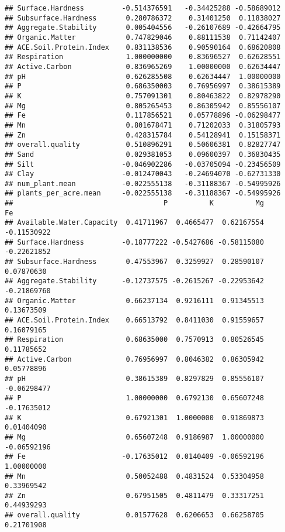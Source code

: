 \documentclass[]{article}
\begin{document}
\begin{verbatim}
## Surface.Hardness         -0.514376591   -0.34425288 -0.58689012
## Subsurface.Hardness       0.280786372    0.31401250  0.11838027
## Aggregate.Stability       0.005404556   -0.26107689 -0.42664795
## Organic.Matter            0.747829046    0.88111538  0.71142407
## ACE.Soil.Protein.Index    0.831138536    0.90590164  0.68620808
## Respiration               1.000000000    0.83696527  0.62628551
## Active.Carbon             0.836965269    1.00000000  0.62634447
## pH                        0.626285508    0.62634447  1.00000000
## P                         0.686350003    0.76956997  0.38615389
## K                         0.757091301    0.80463822  0.82978290
## Mg                        0.805265453    0.86305942  0.85556107
## Fe                        0.117856521    0.05778896 -0.06298477
## Mn                        0.801678471    0.71202033  0.31805793
## Zn                        0.428315784    0.54128941  0.15158371
## overall.quality           0.510896291    0.50606381  0.82827747
## Sand                      0.029381053    0.09600397  0.36830435
## Silt                     -0.046902286   -0.03705094 -0.23456509
## Clay                     -0.012470043   -0.24694070 -0.62731330
## num_plant.mean           -0.022555138   -0.31188367 -0.54995926
## plants_per_acre.mean     -0.022555138   -0.31188367 -0.54995926
##                                    P          K          Mg          Fe
## Available.Water.Capacity  0.41711967  0.4665477  0.62167554 -0.11530922
## Surface.Hardness         -0.18777222 -0.5427686 -0.58115080 -0.22621852
## Subsurface.Hardness       0.47553967  0.3259927  0.28590107  0.07870630
## Aggregate.Stability      -0.12737575 -0.2615267 -0.22953642 -0.21869760
## Organic.Matter            0.66237134  0.9216111  0.91345513  0.13673509
## ACE.Soil.Protein.Index    0.66513792  0.8411030  0.91559657  0.16079165
## Respiration               0.68635000  0.7570913  0.80526545  0.11785652
## Active.Carbon             0.76956997  0.8046382  0.86305942  0.05778896
## pH                        0.38615389  0.8297829  0.85556107 -0.06298477
## P                         1.00000000  0.6792130  0.65607248 -0.17635012
## K                         0.67921301  1.0000000  0.91869873  0.01404090
## Mg                        0.65607248  0.9186987  1.00000000 -0.06592196
## Fe                       -0.17635012  0.0140409 -0.06592196  1.00000000
## Mn                        0.50052488  0.4831524  0.53304958  0.33969542
## Zn                        0.67951505  0.4811479  0.33317251  0.44939293
## overall.quality           0.01577628  0.6206653  0.66258705  0.21701908

\end{verbatim}
\end{document}
